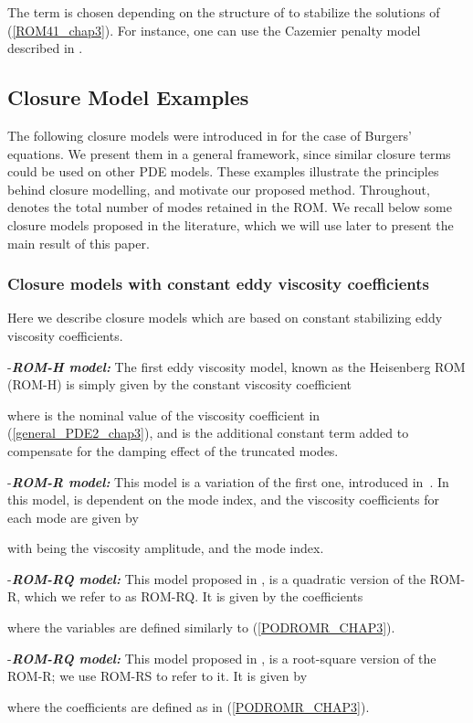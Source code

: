 \documentclass[letterpaper,conference,onecolumn,11pt]{IEEEtran}
\begin{document}
The term  is chosen depending on the structure of
 to stabilize the solutions of
(\ref{ROM41_chap3}). For instance, one can use the Cazemier penalty
model described in \cite{SI13}.

\subsection{Closure Model Examples}
The following closure models were introduced in \cite{WABI12,SI13}
for the case of Burgers' equations. We present them in a general
framework, since similar closure terms could be used on other PDE
models. These examples illustrate the principles behind closure
modelling, and motivate our proposed method. Throughout, 
denotes the total number of modes retained in the ROM. We recall
below some closure models proposed in the literature, which we
will use later to present the main result of this paper.
\subsubsection{Closure models with constant eddy
viscosity coefficients} Here we describe closure models which are
based on constant stabilizing eddy viscosity coefficients.

  {-\bf\it ROM-H model:} The first eddy
viscosity model, known as the Heisenberg ROM (ROM-H) is simply
given by the constant viscosity coefficient

where  is the nominal value of the viscosity coefficient in
(\ref{general_PDE2_chap3}), and  is the additional
constant term added to compensate for the damping effect of the
truncated modes.

{-\bf\it ROM-R model:} This model is a variation of the first one,
introduced in~\cite{R91}. In this model,  is dependent
on the mode index, and the viscosity coefficients for each mode
are given by

with  being the viscosity amplitude, and  the mode
index.

{-\bf\it ROM-RQ model:} This model proposed in \cite{SI13}, is a
quadratic version of the ROM-R, which we refer to as ROM-RQ. It is
given by the coefficients

where the variables are defined similarly to
(\ref{PODROMR_CHAP3}).

{-\bf\it ROM-RQ model:} This model proposed in \cite{SI13}, is a
root-square version of the ROM-R; we use ROM-RS to refer to it. It
is given by

where the coefficients are defined as in (\ref{PODROMR_CHAP3}).
\end{document}
